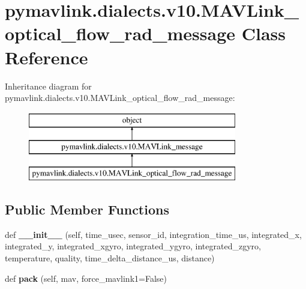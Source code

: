 \hypertarget{classpymavlink_1_1dialects_1_1v10_1_1MAVLink__optical__flow__rad__message}{}\section{pymavlink.\+dialects.\+v10.\+M\+A\+V\+Link\+\_\+optical\+\_\+flow\+\_\+rad\+\_\+message Class Reference}
\label{classpymavlink_1_1dialects_1_1v10_1_1MAVLink__optical__flow__rad__message}
Inheritance diagram for pymavlink.\+dialects.\+v10.\+M\+A\+V\+Link\+\_\+optical\+\_\+flow\+\_\+rad\+\_\+message\+:\begin{figure}[H]
\begin{center}
\leavevmode
\includegraphics[height=3.000000cm]{classpymavlink_1_1dialects_1_1v10_1_1MAVLink__optical__flow__rad__message}
\end{center}
\end{figure}
\subsection*{Public Member Functions}
\begin{DoxyCompactItemize}
\item 
\mbox{\label{classpymavlink_1_1dialects_1_1v10_1_1MAVLink__optical__flow__rad__message_a031490983c2b42e9036bc90e295538c5}} 
def {\bfseries \+\_\+\+\_\+init\+\_\+\+\_\+} (self, time\+\_\+usec, sensor\+\_\+id, integration\+\_\+time\+\_\+us, integrated\+\_\+x, integrated\+\_\+y, integrated\+\_\+xgyro, integrated\+\_\+ygyro, integrated\+\_\+zgyro, temperature, quality, time\+\_\+delta\+\_\+distance\+\_\+us, distance)
\item 
\mbox{\label{classpymavlink_1_1dialects_1_1v10_1_1MAVLink__optical__flow__rad__message_a900215e37f159af6806802c80e88b63a}} 
def {\bfseries pack} (self, mav, force\+\_\+mavlink1=False)
\end{DoxyCompactItemize}
